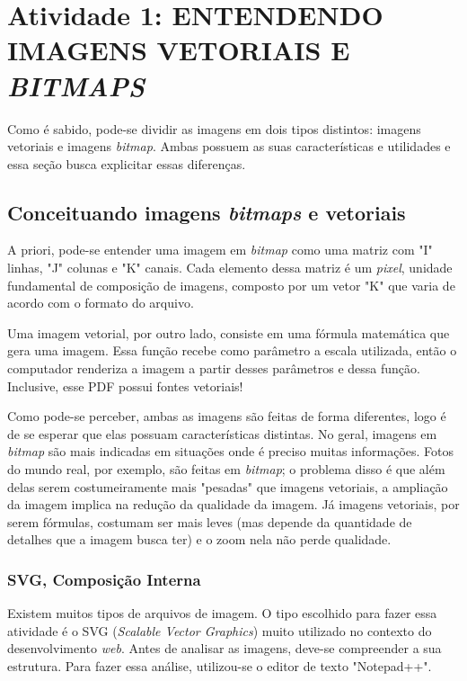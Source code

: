 \captionsetup{justification=centering,margin=0cm}
\label{cap:atividade1}  %

\chapter[Atividade 1: ENTENDENDO IMAGENS VETORIAIS E \textit{BITMAPS}]{Atividade 1: ENTENDENDO IMAGENS VETORIAIS E \textit{BITMAPS}}

Como é sabido, pode-se dividir as imagens em dois tipos distintos: imagens vetoriais e imagens \textit{bitmap}. Ambas possuem as suas características e utilidades e essa seção busca explicitar essas diferenças.

\section{Conceituando imagens \textit{bitmaps} e vetoriais}

A priori, pode-se entender uma imagem em \textit{bitmap} como uma matriz com "I" linhas, "J" colunas e "K" canais. Cada elemento dessa matriz é um \textit{pixel}, unidade fundamental de composição de imagens, composto por um vetor "K" que varia de acordo com o formato do arquivo.

\hspace{1.5 cm} Uma imagem vetorial, por outro lado, consiste em uma fórmula matemática que gera uma imagem. Essa função recebe como parâmetro a escala utilizada, então o computador renderiza a imagem a partir desses parâmetros e dessa função. Inclusive, esse PDF possui fontes vetoriais!

\hspace{1.5 cm} Como pode-se perceber, ambas as imagens são feitas de forma diferentes, logo é de se esperar que elas possuam características distintas. No geral, imagens em \textit{bitmap} são mais indicadas em situações onde é preciso muitas informações. Fotos do mundo real, por exemplo, são feitas em \textit{bitmap}; o problema disso é que além delas serem costumeiramente mais "pesadas" que imagens vetoriais, a ampliação da imagem implica na redução da qualidade da imagem. Já imagens vetoriais, por serem fórmulas, costumam ser mais leves (mas depende da quantidade de detalhes que a imagem busca ter) e o zoom nela não perde qualidade.

\subsection{SVG, Composição Interna}
Existem muitos tipos de arquivos de imagem. O tipo escolhido para fazer essa atividade é o SVG (\textit{Scalable Vector Graphics}) muito utilizado no contexto do desenvolvimento \textit{web}. Antes de analisar as imagens, deve-se compreender a sua estrutura. Para fazer essa análise, utilizou-se o editor de texto "Notepad++".

